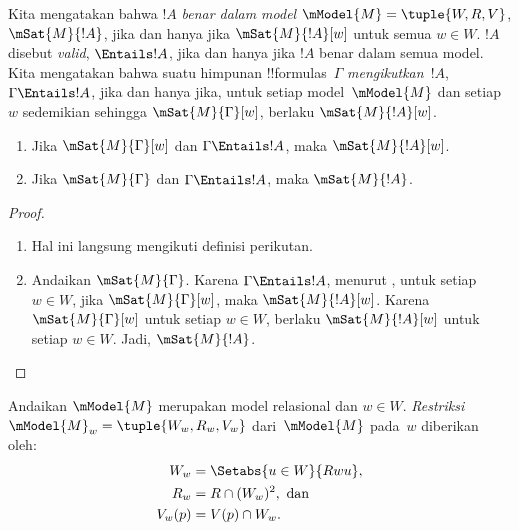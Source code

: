 \documentclass[../../../include/open-logic-section]{subfiles}
\begin{document}


\begin{defn}
  Kita mengatakan bahwa $!A$ \emph{benar dalam model
  $\mModel{M}=\tuple{W,R,V}$}, $\mSat{M}{!A}$, jika dan hanya jika
  $\mSat{M}{!A}[w]$ untuk semua $w\in W$. $!A$ disebut \emph{valid},
  $\Entails !A$, jika dan hanya jika $!A$ benar dalam semua model. Kita
  mengatakan bahwa suatu himpunan !!{formula}s~$\Gamma$
  \emph{mengikutkan}~$!A$, $\Gamma\Entails !A$, jika dan hanya jika, untuk
  setiap model~$\mModel{M}$ dan setiap~$w$ sedemikian sehingga
  $\mSat{M}{\Gamma}[w]$, berlaku $\mSat{M}{!A}[w]$.
\end{defn}

\begin{prop}
  \begin{enumerate}
  \item{} Jika $\mSat{M}{\Gamma}[w]$ dan
    $\Gamma\Entails !A$, maka $\mSat{M}{!A}[w]$.
  \item{} Jika $\mSat{M}{\Gamma}$ dan
    $\Gamma\Entails !A$, maka $\mSat{M}{!A}$.
  \end{enumerate}
\end{prop}

\begin{proof}
  \begin{enumerate}
  \item Hal ini langsung mengikuti definisi perikutan.
  \item Andaikan $\mSat{M}{\Gamma}$. Karena $\Gamma\Entails !A$, menurut
    , untuk setiap $w\in W$, jika
    $\mSat{M}{\Gamma}[w]$, maka $\mSat{M}{!A}[w]$. Karena
    $\mSat{M}{\Gamma}[w]$ untuk setiap $w\in W$, berlaku
    $\mSat{M}{!A}[w]$ untuk setiap $w\in W$. Jadi, $\mSat{M}{!A}$.
  \end{enumerate}
\end{proof}


\begin{defn}
  Andaikan $\mModel{M}$ merupakan model relasional dan $w\in W$.
  \emph{Restriksi} $\mModel{M}_w=\tuple{W_w,R_w,V_w}$ dari~$\mModel{M}$
  pada~$w$ diberikan oleh:
  \begin{align*}
    W_w &= \Setabs{u\in W}{Rwu},\\
    R_w &= R\cap(W_w)^2, \text{ dan}\\
    V_w(p) &= V(p)\cap W_w.
  \end{align*}
\end{defn}
\end{document}

